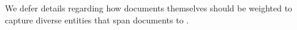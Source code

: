 We defer details regarding how documents themselves should be weighted to capture diverse entities that span documents to .
